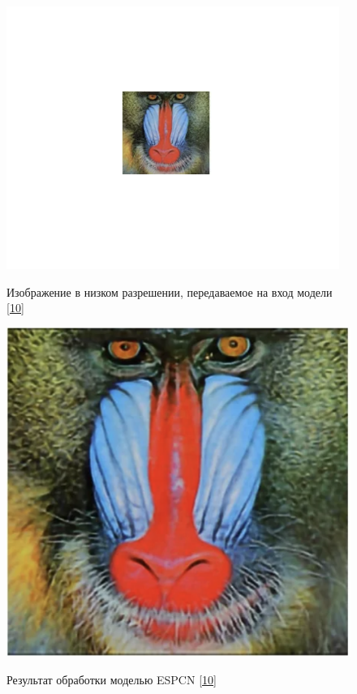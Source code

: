 \documentclass[a4paper,14pt]{extreport}
\begin{document}
        \begin{figure}[!h]
            \begin{center}
                \begin{minipage}[!h]{0.39\linewidth}
                    \begin{center}
                        \includegraphics[width=1\linewidth]{images-pipeline/LR.png}
                        \label{ris:json}
                        \caption{Изображение в низком разрешении, передаваемое на вход модели \hyperlink{[10]}{[10]}}
                    \end{center}
                \end{minipage}
                \hfill
                \begin{minipage}[!h]{0.39\linewidth}
                    \includegraphics[width=1\linewidth]{images-pipeline/SR.png}
                    \label{ris:netron}
                    \caption{Результат обработки моделью ESPCN \hyperlink{[10]}{[10]}}
                \end{minipage}
            \end{center}
        \end{figure}
\end{document}
